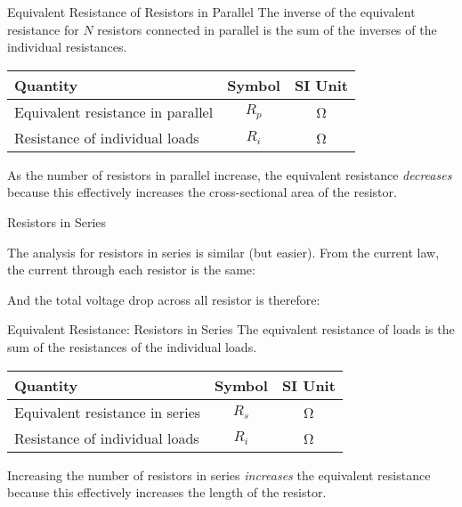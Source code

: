 \documentclass[12pt,aspectratio=169]{beamer}
\begin{document}
\begin{frame}{Equivalent Resistance of Resistors in Parallel} 
  The inverse of the equivalent resistance for $N$ resistors connected in
  parallel is the sum of the inverses of the individual resistances.

  \begin{center}
    \begin{tabular}{l|c|c}
      \rowcolor{pink}
      \textbf{Quantity} & \textbf{Symbol} & \textbf{SI Unit} \\ \hline
      Equivalent resistance in parallel & $R_p$ & \si\ohm \\
      Resistance of individual loads    & $R_i$ & \si\ohm
    \end{tabular}
  \end{center}
  As the number of resistors in parallel increase, the equivalent resistance
  \emph{decreases} because this effectively increases the cross-sectional
  area of the resistor.
\end{frame}



\begin{frame}{Resistors in Series}
  \begin{center}
  \end{center}

  \vspace{.1in}The analysis for resistors in series is similar (but easier).
  From the current law, the current through each resistor is the same:


  \vspace{-.15in}And the total voltage drop across all resistor is therefore:

\end{frame}



\begin{frame}{Equivalent Resistance: Resistors in Series}
  The equivalent resistance of loads is the sum of the resistances of the
  individual loads.
  
  \begin{center}
    \begin{tabular}{l|c|c}
      \rowcolor{pink}
      \textbf{Quantity} & \textbf{Symbol} & \textbf{SI Unit} \\ \hline
      Equivalent resistance in series & $R_s$ & \si\ohm \\
      Resistance of individual loads  & $R_i$ & \si\ohm
    \end{tabular}
  \end{center}
  Increasing the number of resistors in series \emph{increases} the equivalent
  resistance because this effectively increases the length of the resistor.
\end{frame}
\end{document}
